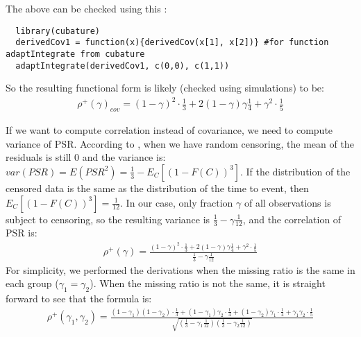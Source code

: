 \documentclass[]{article}
\begin{document}
The above can be checked using this :

{\tiny
{\begin{verbatim}
  library(cubature)
  derivedCov1 = function(x){derivedCov(x[1], x[2])} #for function adaptIntegrate from cubature
  adaptIntegrate(derivedCov1, c(0,0), c(1,1))
\end{verbatim}
}}

So the resulting functional form is likely (checked using simulations) to be:
	$$
	\begin{aligned}
    \rho^+(\gamma)_{cov} = (1-\gamma)^2\cdot \frac{1}{3} + 2(1-\gamma)\gamma \frac{1}{4} +\gamma^2 \cdot \frac{1}{5}
	\end{aligned}
	$$
  
If we want to compute correlation instead of covariance, we need to compute variance of PSR. According to \cite{shepherd2016probability}, when we have random censoring, the mean of the residuals is still 0 and the variance is: $var(PSR) = E(PSR^2) = \frac{1}{3} - E_C\left[    \left(  1-F(C)  \right) ^3 \right]$. If the distribution of the censored data is the same as the distribution of the time to event, then $E_C\left[    \left(  1-F(C)  \right) ^3 \right] = \frac{1}{12}$. In our case, only fraction $\gamma$ of all observations is subject to censoring, so the resulting variance is $\frac{1}{3} - \gamma \frac{1}{12}$, and the correlation of PSR is:
	$$
	\begin{aligned}
    \rho^+(\gamma) = \frac{(1-\gamma)^2\cdot \frac{1}{3} + 2(1-\gamma)\gamma \frac{1}{4} +\gamma^2 \cdot \frac{1}{5}}{\frac{1}{3} - \gamma \frac{1}{12}}
	\end{aligned}
	$$
For simplicity, we performed the derivations when the missing ratio is the same in each group ($\gamma_1 = \gamma_2$). When the missing ratio is not the same, it is straight forward to see that the formula is:
  $$
  \begin{aligned}
      \rho^+(\gamma_1, \gamma_2) =  \frac{(1-\gamma_1)(1-\gamma_2)\cdot \frac{1}{3} + (1-\gamma_1)\gamma_2 \cdot \frac{1}{4} + (1-\gamma_2)\gamma_1 \cdot \frac{1}{4} +\gamma_1  \gamma_2 \cdot \frac{1}{5}}{\sqrt{\left(\frac{1}{3} - \gamma_1 \frac{1}{12}\right)    \left(\frac{1}{3} - \gamma_2 \frac{1}{12}\right)}} 
  \end{aligned}
  $$


~\\
  
\end{document}
